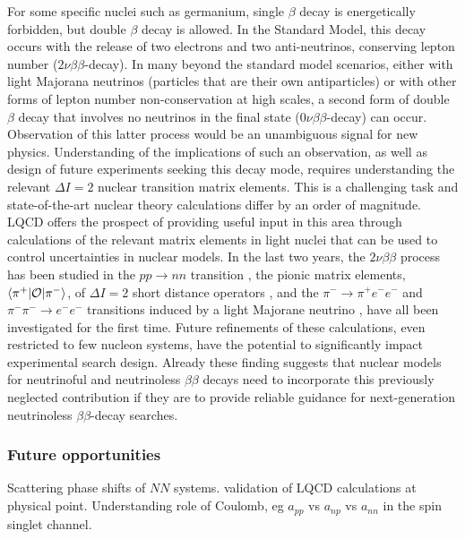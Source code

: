 For some specific nuclei such as germanium, single $\beta$ decay is energetically forbidden, but double $\beta$ decay is allowed. In the Standard Model, this decay occurs with the release of two electrons and two anti-neutrinos, conserving lepton number  ($2\nu\beta\beta$-decay). In many beyond the standard model scenarios, either with light Majorana neutrinos (particles that are their own antiparticles) or with other forms of lepton number non-conservation at high scales,  a second form of  double $\beta$ decay that involves no neutrinos in the final state ($0\nu\beta\beta$-decay) can occur. Observation of this latter process would be an unambiguous signal for new physics. Understanding of the implications of such an observation, as well as design of future experiments seeking this decay mode, requires understanding the relevant $\Delta I=2$ nuclear transition matrix elements. This is a challenging task and state-of-the-art nuclear theory calculations differ by an order of magnitude. LQCD offers the prospect of providing useful input in this area through calculations of the relevant matrix elements in light nuclei that can be used to control uncertainties in nuclear models. In the last two years, the $2\nu\beta\beta$ process has been studied in the $pp\to nn$ transition \cite{Tiburzi:2017iux,Shanahan:2017bgi},  the pionic matrix elements, $\langle \pi^+ | {\cal O} | \pi^- \rangle$, of $\Delta I =2$ short distance operators \cite{Nicholson:2018mwc}, and the $\pi^-\to \pi^+ e^- e^-$ and $\pi^-\pi^-\to e^-e^-$ transitions induced  by a light Majorane neutrino \cite{Feng:2018pdq,Murphy2018ICHEP}, have all been investigated for the first time. Future refinements of these calculations, even restricted to few nucleon systems, have the potential to significantly impact experimental search design.  Already  these finding suggests that nuclear models for neutrinoful and neutrinoless $\beta\beta$ decays need to incorporate this previously neglected contribution if they are to provide reliable guidance for next-generation neutrinoless $\beta\beta$-decay searches. 



\subsubsection{Future opportunities}



Scattering  phase shifts of $NN$ systems. validation of LQCD calculations at physical point. Understanding role of Coulomb, eg $a_{pp}$ vs $a_{np}$ vs $a_{nn}$ in the spin singlet channel.

